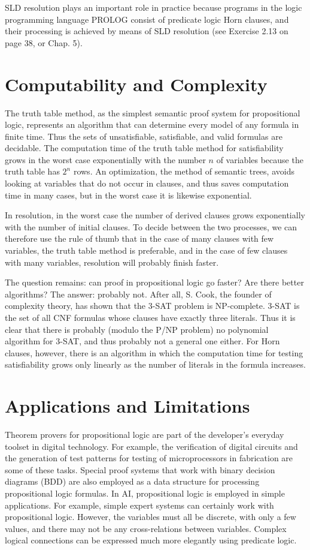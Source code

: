 \documentclass[10pt]{book}
\begin{document}
SLD resolution plays an important role in practice because programs in the logic programming language PROLOG consist of predicate logic Horn clauses, and their processing is achieved by means of SLD resolution (see Exercise 2.13 on page 38, or Chap. 5).

\section{Computability and Complexity}
The truth table method, as the simplest semantic proof system for propositional logic, represents an algorithm that can determine every model of any formula in finite time. Thus the sets of unsatisfiable, satisfiable, and valid formulas are decidable. The computation time of the truth table method for satisfiability grows in the worst case exponentially with the number $n$ of variables because the truth table has $2^{n}$ rows. An optimization, the method of semantic trees, avoids looking at variables that do not occur in clauses, and thus saves computation time in many cases, but in the worst case it is likewise exponential.

In resolution, in the worst case the number of derived clauses grows exponentially with the number of initial clauses. To decide between the two processes, we can therefore use the rule of thumb that in the case of many clauses with few variables, the truth table method is preferable, and in the case of few clauses with many variables, resolution will probably finish faster.

The question remains: can proof in propositional logic go faster? Are there better algorithms? The answer: probably not. After all, S. Cook, the founder of complexity theory, has shown that the 3-SAT problem is NP-complete. 3-SAT is the set of all CNF formulas whose clauses have exactly three literals. Thus it is clear that there is probably (modulo the P/NP problem) no polynomial algorithm for 3-SAT, and thus probably not a general one either. For Horn clauses, however, there is an algorithm in which the computation time for testing satisfiability grows only linearly as the number of literals in the formula increases.

\section{Applications and Limitations}
Theorem provers for propositional logic are part of the developer's everyday toolset in digital technology. For example, the verification of digital circuits and the generation of test patterns for testing of microprocessors in fabrication are some of these tasks. Special proof systems that work with binary decision diagrams (BDD) are also employed as a data structure for processing propositional logic formulas.
In AI, propositional logic is employed in simple applications. For example, simple expert systems can certainly work with propositional logic. However, the variables must all be discrete, with only a few values, and there may not be any cross-relations between variables. Complex logical connections can be expressed much more elegantly using predicate logic.
\end{document}
